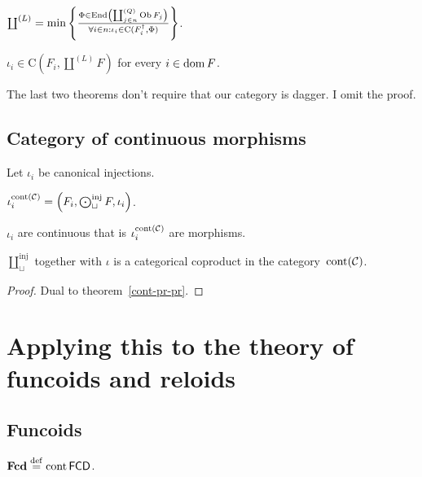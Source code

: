 \begin{obvious}
$\coprod^{(L)} = \min \left\{ \frac{ \Phi \in \operatorname{End} \left( \coprod^{(Q)}_{j \in
n} \operatorname{Ob} F_j \right) }{ \forall i \in n : \iota_i
\in \mathrm{C} (F_i^{\dagger} , \Phi) }\right\}$.{\hspace*{\fill}}{\medskip}
\end{obvious}

\begin{cor}
  $\iota_i \in \mathrm{C} \left( F_i , \coprod^{(L)} F \right)$ for every $i
  \in \operatorname{dom} F$.
\end{cor}

\begin{rem}
The last two theorems don't require that our category is dagger. I omit the proof.
\end{rem}

\subsection{Category of continuous morphisms}

Let $\iota_i$ be canonical injections.

\begin{defn}
$\iota^{\operatorname{cont}(\mathcal{C})}_i = \left(F_i,\bigodot^{\operatorname{inj}}_{\sqcup}F,\iota_i\right)$.
\end{defn}

\begin{obvious}
$\iota_i$ are continuous that is $\iota^{\operatorname{cont}(\mathcal{C})}_i$ are morphisms.
\end{obvious}

\begin{thm}
$\coprod^{\operatorname{inj}}_{\sqcup}$ together with $\iota$ is a categorical coproduct in the category~$\operatorname{cont}(\mathcal{C})$.
\end{thm}

\begin{proof}
Dual to theorem~\ref{cont-pr-pr}.
\end{proof}

\section{Applying this to the theory of funcoids and reloids}

\subsection{Funcoids}

\begin{defn}
  $\mathbf{Fcd} \overset{\mathrm{def}}{=} \operatorname{cont} \mathsf{FCD}$.
\end{defn}

